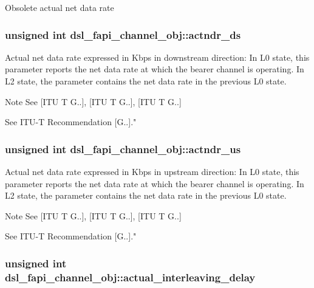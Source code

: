 Obsolete actual net data rate \hypertarget{structdsl__fapi__channel__obj_a82ffc87c655718c66427f80533e49cdb}{
\subsubsection[{actndr\-\_\-ds}]{\setlength{\rightskip}{0pt plus 5cm}unsigned int dsl\-\_\-fapi\-\_\-channel\-\_\-obj\-::actndr\-\_\-ds}}\label{structdsl__fapi__channel__obj_a82ffc87c655718c66427f80533e49cdb}
Actual net data rate expressed in Kbps in downstream direction\-: In L0 state, this parameter reports the net data rate at which the bearer channel is operating. In L2 state, the parameter contains the net data rate in the previous L0 state. \begin{DoxyNote}{Note}
See \mbox{[}I\-T\-U T G..\mbox{]}, \mbox{[}I\-T\-U T G..\mbox{]}, \mbox{[}I\-T\-U T G..\mbox{]} 

See I\-T\-U-\/\-T Recommendation \mbox{[}G..\mbox{]}." 
\end{DoxyNote}
\hypertarget{structdsl__fapi__channel__obj_aa12526963f84f3e5d2f47ab6d24c5af5}{
\subsubsection[{actndr\-\_\-us}]{\setlength{\rightskip}{0pt plus 5cm}unsigned int dsl\-\_\-fapi\-\_\-channel\-\_\-obj\-::actndr\-\_\-us}}\label{structdsl__fapi__channel__obj_aa12526963f84f3e5d2f47ab6d24c5af5}
Actual net data rate expressed in Kbps in upstream direction\-: In L0 state, this parameter reports the net data rate at which the bearer channel is operating. In L2 state, the parameter contains the net data rate in the previous L0 state. \begin{DoxyNote}{Note}
See \mbox{[}I\-T\-U T G..\mbox{]}, \mbox{[}I\-T\-U T G..\mbox{]}, \mbox{[}I\-T\-U T G..\mbox{]} 

See I\-T\-U-\/\-T Recommendation \mbox{[}G..\mbox{]}." 
\end{DoxyNote}
\hypertarget{structdsl__fapi__channel__obj_a3bae6d5253cf7ee22ea613847f42b68c}{
\subsubsection[{actual\-\_\-interleaving\-\_\-delay}]{\setlength{\rightskip}{0pt plus 5cm}unsigned int dsl\-\_\-fapi\-\_\-channel\-\_\-obj\-::actual\-\_\-interleaving\-\_\-delay}}\label{structdsl__fapi__channel__obj_a3bae6d5253cf7ee22ea613847f42b68c}
